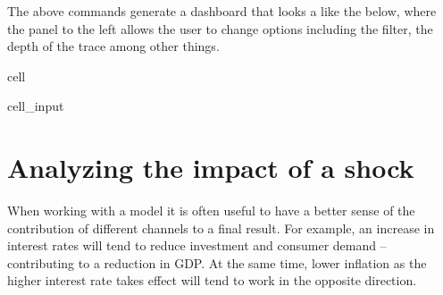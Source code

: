 \documentclass[letterpaper,10pt,english]{jupyterBook}
\begin{document}
\begin{sphinxVerbatim}[commandchars=\\\{\}]
  
\end{sphinxVerbatim}

\sphinxAtStartPar
The above commands generate a dashboard that looks a like the below, where the panel to the left allows the user to change options including the filter, the depth of the trace among other things.

\sphinxAtStartPar
{}

\begin{sphinxuseclass}{cell}\begin{sphinxVerbatimInput}

\begin{sphinxuseclass}{cell_input}
\begin{sphinxVerbatim}[commandchars=\\\{\}]
\end{sphinxVerbatim}

\end{sphinxuseclass}\end{sphinxVerbatimInput}

\end{sphinxuseclass}
\sphinxstepscope


\chapter{Analyzing the impact of a shock}
\label{\detokenize{content/06_ModelAnalytics/AttributionSomeFeatures:analyzing-the-impact-of-a-shock}}\label{\detokenize{content/06_ModelAnalytics/AttributionSomeFeatures::doc}}
\sphinxAtStartPar
When working with a model it is often useful to have a better sense of the contribution of different channels to a final result.  For example, an increase in interest rates will tend to reduce investment and consumer demand – contributing to a reduction in GDP. At the same time, lower inflation as the higher interest rate takes effect will tend to work in the opposite direction.
\end{document}
